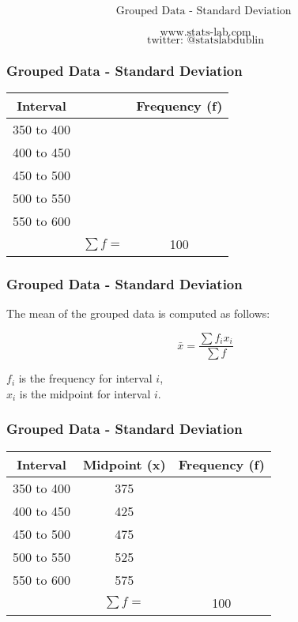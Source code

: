 \documentclass{beamer}
\begin{document}
\begin{frame}

{
\Huge
\[\mbox{Grouped Data - Standard Deviation } \]
}
{
\Large

\[\mbox{www.stats-lab.com} \]
\[ \mbox{twitter: @statslabdublin} \] 

}
\end{frame}
\begin{frame}
\frametitle{Grouped Data - Standard Deviation}
{
\begin{center}
\Large

\begin{tabular}{|c|c|c|}
\hline Interval & \phantom{midpoint (x)} & Frequency (f) \\ 
\hline \hline 350 to 400 &  &  \\ 
\hline 400 to 450 &  &  \\ 
\hline 450 to 500 &  &  \\ 
\hline 500 to 550 &  &  \\ 
\hline 550 to 600 &  &  \\ \hline
\hline  &  $\sum f = $& 100  \\ 
\hline 
\end{tabular} 
\end{center}
}

\end{frame}
\begin{frame}
\frametitle{Grouped Data - Standard Deviation}
{
\LARGE
The mean of the grouped data is computed as follows:

\[ \bar{x} = \frac{\sum f_ix_i}{\sum f} \]
\bigskip

$f_i$ is the frequency for interval $i$,\\
$x_i$ is the midpoint for interval $i$.

}

\end{frame}
\begin{frame}
\frametitle{Grouped Data - Standard Deviation}
{
\begin{center}
\Large

\begin{tabular}{|c|c|c|}
\hline Interval & Midpoint (x)& Frequency (f) \\ 
\hline \hline 350 to 400 & 375  &  \\ 
\hline 400 to 450 & 425 &  \\ 
\hline 450 to 500 & 475 &  \\ 
\hline 500 to 550 & 525 &  \\ 
\hline 550 to 600 & 575 &  \\ \hline
\hline  &  $\sum f = $& 100  \\ 
\hline 
\end{tabular} 
\end{center}
}

\end{frame}
\end{document}
